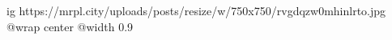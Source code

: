  
 
 
 
 

\ifcmt
  ig https://mrpl.city/uploads/posts/resize/w/750x750/rvgdqzw0mhinlrto.jpg
  @wrap center
  @width 0.9
\fi
